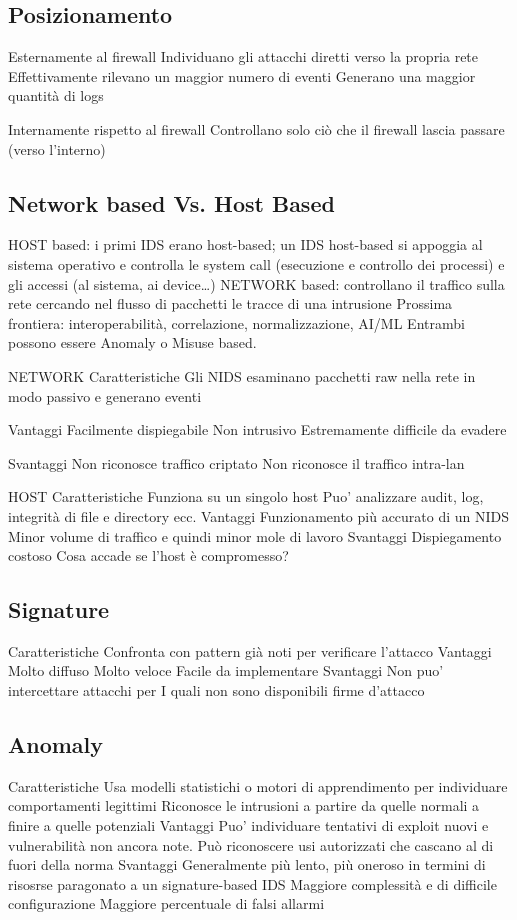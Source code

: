 \subsection{Posizionamento}

Esternamente al firewall
Individuano gli attacchi diretti verso la propria rete
Effettivamente rilevano un maggior numero di eventi
Generano una maggior quantità di logs

Internamente rispetto al firewall
Controllano solo ciò che il firewall lascia passare (verso l’interno)

\subsection{Network based Vs. Host Based}

HOST based: i primi IDS erano host-based; un IDS host-based si appoggia al sistema operativo e controlla le system call (esecuzione e controllo dei processi) e gli accessi (al sistema, ai device…)
NETWORK based: controllano il traffico sulla rete cercando nel flusso di pacchetti le tracce di una intrusione
Prossima frontiera: interoperabilità, correlazione, normalizzazione, AI/ML
Entrambi possono essere Anomaly o Misuse based.

NETWORK
Caratteristiche
Gli NIDS esaminano pacchetti raw nella rete in modo passivo e generano eventi

Vantaggi
Facilmente dispiegabile
Non intrusivo
Estremamente difficile da evadere

Svantaggi
Non riconosce traffico criptato
Non riconosce il traffico intra-lan

HOST
Caratteristiche
Funziona su un singolo host
Puo’ analizzare audit, log, integrità di file e directory ecc.
Vantaggi
Funzionamento più accurato di un NIDS
Minor volume di traffico e quindi minor mole di lavoro
Svantaggi
Dispiegamento costoso
Cosa accade se l’host è compromesso?



\subsection{Signature}

Caratteristiche
Confronta con pattern già noti
per verificare l’attacco
Vantaggi
Molto diffuso
Molto veloce
Facile da implementare
Svantaggi
Non puo’ intercettare attacchi per I quali non sono disponibili firme d’attacco

\subsection{Anomaly}

Caratteristiche
 Usa modelli statistichi o motori di apprendimento per individuare comportamenti legittimi
 Riconosce le intrusioni a partire da quelle normali a finire a quelle potenziali
  Vantaggi
 Puo’ individuare tentativi di exploit nuovi e vulnerabilità non ancora note.
 Può riconoscere usi autorizzati che cascano al di fuori della norma
  Svantaggi
 Generalmente più lento, più oneroso in termini di risosrse paragonato a un signature-based IDS
Maggiore complessità e di difficile configurazione
Maggiore percentuale di falsi allarmi


